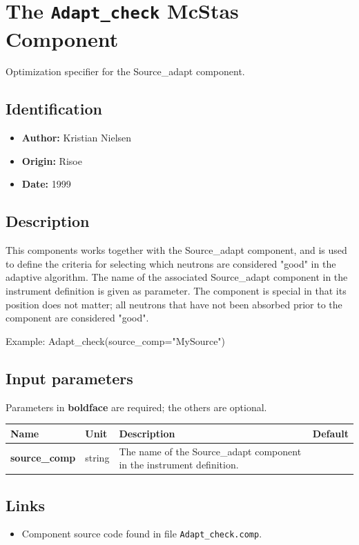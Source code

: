 \section{The \texttt{Adapt\_check} McStas Component}
Optimization specifier for the Source\_adapt component.

\subsection*{Identification}
\begin{itemize}
  \item \textbf{Author:} Kristian Nielsen
  \item \textbf{Origin:} Risoe
  \item \textbf{Date:} 1999
\end{itemize}

\subsection*{Description}
This components works together with the Source\_adapt component, and is used to define the criteria for selecting which neutrons are considered "good" in the adaptive algorithm. The name of the associated Source\_adapt component in the instrument definition is given as parameter. The component is special in that its position does not matter; all neutrons that have not been absorbed prior to the component are considered "good".

Example: Adapt\_check(source\_comp="MySource")

\subsection*{Input parameters}
Parameters in \textbf{boldface} are required; the others are optional.

\begin{longtable}{p{}p{}p{}p{}}
\toprule
\textbf{Name} & \textbf{Unit} & \textbf{Description} & \textbf{Default} \\
\midrule
\endhead
\textbf{source\_comp} & string & The name of the Source\_adapt component in the instrument definition. &  \\
\bottomrule
\end{longtable}

\subsection*{Links}
\begin{itemize}
  \item Component source code found in file \texttt{Adapt\_check.comp}.
\end{itemize}
